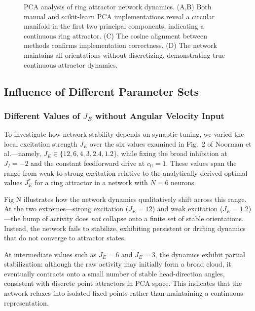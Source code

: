 \documentclass[11pt,a4paper]{article}
\begin{document}
\begin{figure}[H]
\caption{PCA analysis of ring attractor network dynamics. (A,B) Both manual and scikit-learn PCA implementations reveal a circular manifold in the first two principal components, indicating a continuous ring attractor. (C) The cosine alignment between methods confirms implementation correctness. (D) The network maintains all orientations without discretizing, demonstrating true continuous attractor dynamics.}
\label{fig:pca_analysis}
\end{figure}


\subsection{Influence of Different Parameter Sets}

\subsubsection*{Different Values of \( J_E \) without Angular Velocity Input}


To investigate how network stability depends on synaptic tuning, we varied the local excitation strength \( J_E \) over the six values examined in Fig.~2 of Noorman et al.—namely, \( J_E \in \{12, 6, 4, 3, 2.4, 1.2\} \), while fixing the broad inhibition at \( J_I = -2 \) and the constant feedforward drive at \( c_{\text{ff}} = 1 \). These values span the range from weak to strong excitation relative to the analytically derived optimal values \( J_E^\ast \) for a ring attractor in a network with \( N = 6 \) neurons.

Fig N illustrates how the network dynamics qualitatively shift across this range. 
At the two extremes—strong excitation (\( J_E = 12 \)) and weak excitation (\( J_E = 1.2 \))—the bump of activity does \emph{not} collapse onto a finite set of stable orientations. 
Instead, the network fails to stabilize, exhibiting persistent or drifting dynamics that do not converge to attractor states. 

At intermediate values such as \( J_E = 6 \) and \( J_E = 3 \), the dynamics exhibit partial stabilization: although the raw activity may initially form a broad cloud, it eventually contracts onto a small number of stable head-direction angles, consistent with discrete point attractors in PCA space. 
This indicates that the network relaxes into isolated fixed points rather than maintaining a continuous representation.
\end{document}
